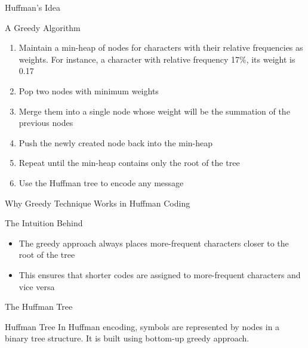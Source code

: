\documentclass{beamer}
\begin{document}
	\begin{frame}{Huffman's Idea}
		
		\begin{alertblock}{A Greedy Algorithm}
			
			\begin{enumerate}
				\item Maintain a min-heap of nodes for characters with their relative frequencies as weights. For instance, a character with relative frequency 17\%, its weight is 0.17
				
				\item Pop two nodes with minimum weights 
				
				\item Merge them into a single node whose weight will be the summation of the previous nodes
				
				\item Push the newly created node back into the min-heap
				
				\item Repeat until the min-heap contains only the root of the tree
				
				\item Use the Huffman tree to encode any message
				
			\end{enumerate}
			
		\end{alertblock}
		
	\end{frame}
	
	\begin{frame}{Why Greedy Technique Works in Huffman Coding}
		
		\begin{block}{The Intuition Behind}
			\begin{itemize}
				\item The greedy approach always places more-frequent characters closer to the root of the tree
				
				\item This ensures that shorter codes are assigned to more-frequent characters and vice versa
				
			\end{itemize}
		\end{block}
	\end{frame}
	
	\begin{frame}{The Huffman Tree}
		\begin{alertblock}{Huffman Tree}
			In Huffman encoding, symbols are represented by nodes in a binary tree structure. It is built using bottom-up greedy approach.
		\end{alertblock}
	\end{frame}
	
\end{document}
